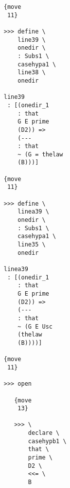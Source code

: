 \documentclass[12pt]{article}
\begin{document}
\begin{verbatim}
                                    {move 
                                     11}

                                    >>> define \
                                        line39 \
                                        onedir \
                                        : Subs1 \
                                        casehypa1 \
                                        line38 \
                                        onedir

                                    line39 
                                     : [(onedir_1 
                                        : that 
                                        G E prime 
                                        (D2)) => 
                                        (--- 
                                        : that 
                                        ~ (G = thelaw 
                                        (B)))]

                                    {move 
                                     11}

                                    >>> define \
                                        linea39 \
                                        onedir \
                                        : Subs1 \
                                        casehypa1 \
                                        line35 \
                                        onedir

                                    linea39 
                                     : [(onedir_1 
                                        : that 
                                        G E prime 
                                        (D2)) => 
                                        (--- 
                                        : that 
                                        ~ (G E Usc 
                                        (thelaw 
                                        (B))))]

                                    {move 
                                     11}

                                    >>> open

                                       {move 
                                        13}

                                       >>> \
                                           declare \
                                           casehypb1 \
                                           that \
                                           prime \
                                           D2 \
                                           <<= \
                                           B


\end{verbatim}
\end{document}
